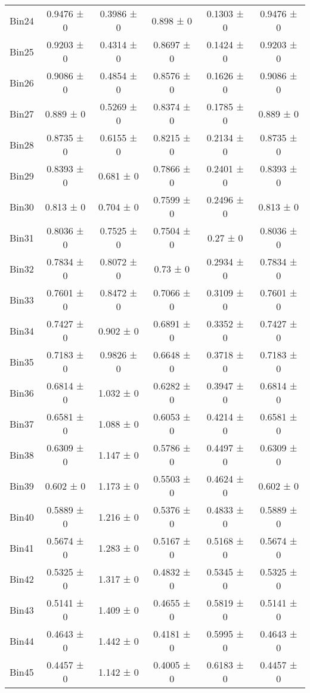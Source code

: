 \begin{tabular}{@{\extracolsep{4pt}}lccccc@{}}
     Bin24 & 0.9476 ± 0 & 0.3986 ± 0 & 0.898 ± 0 & 0.1303 ± 0 & 0.9476 ± 0 \\ 
     Bin25 & 0.9203 ± 0 & 0.4314 ± 0 & 0.8697 ± 0 & 0.1424 ± 0 & 0.9203 ± 0 \\ 
     Bin26 & 0.9086 ± 0 & 0.4854 ± 0 & 0.8576 ± 0 & 0.1626 ± 0 & 0.9086 ± 0 \\ 
     Bin27 & 0.889 ± 0 & 0.5269 ± 0 & 0.8374 ± 0 & 0.1785 ± 0 & 0.889 ± 0 \\ 
     Bin28 & 0.8735 ± 0 & 0.6155 ± 0 & 0.8215 ± 0 & 0.2134 ± 0 & 0.8735 ± 0 \\ 
     Bin29 & 0.8393 ± 0 & 0.681 ± 0 & 0.7866 ± 0 & 0.2401 ± 0 & 0.8393 ± 0 \\ 
     Bin30 & 0.813 ± 0 & 0.704 ± 0 & 0.7599 ± 0 & 0.2496 ± 0 & 0.813 ± 0 \\ 
     Bin31 & 0.8036 ± 0 & 0.7525 ± 0 & 0.7504 ± 0 & 0.27 ± 0 & 0.8036 ± 0 \\ 
     Bin32 & 0.7834 ± 0 & 0.8072 ± 0 & 0.73 ± 0 & 0.2934 ± 0 & 0.7834 ± 0 \\ 
     Bin33 & 0.7601 ± 0 & 0.8472 ± 0 & 0.7066 ± 0 & 0.3109 ± 0 & 0.7601 ± 0 \\ 
     Bin34 & 0.7427 ± 0 & 0.902 ± 0 & 0.6891 ± 0 & 0.3352 ± 0 & 0.7427 ± 0 \\ 
     Bin35 & 0.7183 ± 0 & 0.9826 ± 0 & 0.6648 ± 0 & 0.3718 ± 0 & 0.7183 ± 0 \\ 
     Bin36 & 0.6814 ± 0 & 1.032 ± 0 & 0.6282 ± 0 & 0.3947 ± 0 & 0.6814 ± 0 \\ 
     Bin37 & 0.6581 ± 0 & 1.088 ± 0 & 0.6053 ± 0 & 0.4214 ± 0 & 0.6581 ± 0 \\ 
     Bin38 & 0.6309 ± 0 & 1.147 ± 0 & 0.5786 ± 0 & 0.4497 ± 0 & 0.6309 ± 0 \\ 
     Bin39 & 0.602 ± 0 & 1.173 ± 0 & 0.5503 ± 0 & 0.4624 ± 0 & 0.602 ± 0 \\ 
     Bin40 & 0.5889 ± 0 & 1.216 ± 0 & 0.5376 ± 0 & 0.4833 ± 0 & 0.5889 ± 0 \\ 
     Bin41 & 0.5674 ± 0 & 1.283 ± 0 & 0.5167 ± 0 & 0.5168 ± 0 & 0.5674 ± 0 \\ 
     Bin42 & 0.5325 ± 0 & 1.317 ± 0 & 0.4832 ± 0 & 0.5345 ± 0 & 0.5325 ± 0 \\ 
     Bin43 & 0.5141 ± 0 & 1.409 ± 0 & 0.4655 ± 0 & 0.5819 ± 0 & 0.5141 ± 0 \\ 
     Bin44 & 0.4643 ± 0 & 1.442 ± 0 & 0.4181 ± 0 & 0.5995 ± 0 & 0.4643 ± 0 \\ 
     Bin45 & 0.4457 ± 0 & 1.142 ± 0 & 0.4005 ± 0 & 0.6183 ± 0 & 0.4457 ± 0 \\ 

\end{tabular}
